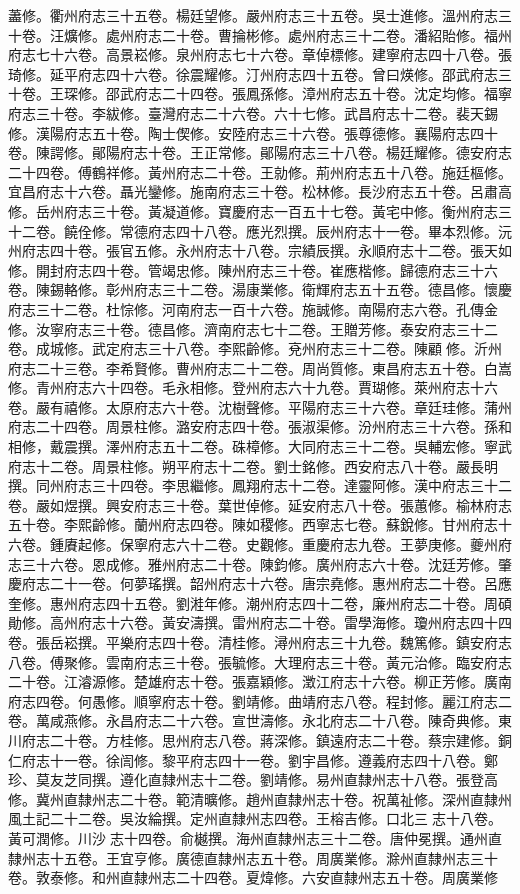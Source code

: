 \begin{pinyinscope}
藎修。衢州府志三十五卷。楊廷望修。嚴州府志三十五卷。吳士進修。溫州府志三十卷。汪爌修。處州府志二十卷。曹掄彬修。處州府志三十二卷。潘紹貽修。福州府志七十六卷。高景崧修。泉州府志七十六卷。章倬標修。建寧府志四十八卷。張琦修。延平府志四十六卷。徐震耀修。汀州府志四十五卷。曾曰煐修。邵武府志三十卷。王琛修。邵武府志二十四卷。張鳳孫修。漳州府志五十卷。沈定均修。福寧府志三十卷。李紱修。臺灣府志二十六卷。六十七修。武昌府志十二卷。裴天錫修。漢陽府志五十卷。陶士偰修。安陸府志三十六卷。張尊德修。襄陽府志四十卷。陳諤修。鄖陽府志十卷。王正常修。鄖陽府志三十八卷。楊廷耀修。德安府志二十四卷。傅鶴祥修。黃州府志二十卷。王勍修。荊州府志五十八卷。施廷樞修。宜昌府志十六卷。聶光鑾修。施南府志三十卷。松林修。長沙府志五十卷。呂肅高修。岳州府志三十卷。黃凝道修。寶慶府志一百五十七卷。黃宅中修。衡州府志三十二卷。饒佺修。常德府志四十八卷。應光烈撰。辰州府志十一卷。畢本烈修。沅州府志四十卷。張官五修。永州府志十八卷。宗績辰撰。永順府志十二卷。張天如修。開封府志四十卷。管竭忠修。陳州府志三十卷。崔應楷修。歸德府志三十六卷。陳錫輅修。彰州府志三十二卷。湯康業修。衛輝府志五十五卷。德昌修。懷慶府志三十二卷。杜悰修。河南府志一百十六卷。施誠修。南陽府志六卷。孔傳金修。汝寧府志三十卷。德昌修。濟南府志七十二卷。王贈芳修。泰安府志三十二卷。成城修。武定府志三十八卷。李熙齡修。兗州府志三十二卷。陳顧修。沂州府志二十三卷。李希賢修。曹州府志二十二卷。周尚質修。東昌府志五十卷。白嵩修。青州府志六十四卷。毛永相修。登州府志六十九卷。賈瑚修。萊州府志十六卷。嚴有禧修。太原府志六十卷。沈樹聲修。平陽府志三十六卷。章廷珪修。蒲州府志二十四卷。周景柱修。潞安府志四十卷。張淑渠修。汾州府志三十六卷。孫和相修，戴震撰。澤州府志五十二卷。硃樟修。大同府志三十二卷。吳輔宏修。寧武府志十二卷。周景柱修。朔平府志十二卷。劉士銘修。西安府志八十卷。嚴長明撰。同州府志三十四卷。李思繼修。鳳翔府志十二卷。達靈阿修。漢中府志三十二卷。嚴如煜撰。興安府志三十卷。葉世倬修。延安府志八十卷。張蕙修。榆林府志五十卷。李熙齡修。蘭州府志四卷。陳如稷修。西寧志七卷。蘇銳修。甘州府志十六卷。鍾賡起修。保寧府志六十二卷。史觀修。重慶府志九卷。王夢庚修。夔州府志三十六卷。恩成修。雅州府志二十卷。陳鈞修。廣州府志六十卷。沈廷芳修。肇慶府志二十一卷。何夢瑤撰。韶州府志十六卷。唐宗堯修。惠州府志二十卷。呂應奎修。惠州府志四十五卷。劉溎年修。潮州府志四十二卷，廉州府志二十卷。周碩勛修。高州府志十六卷。黃安濤撰。雷州府志二十卷。雷學海修。瓊州府志四十四卷。張岳崧撰。平樂府志四十卷。清桂修。潯州府志三十九卷。魏篤修。鎮安府志八卷。傅聚修。雲南府志三十卷。張毓修。大理府志三十卷。黃元治修。臨安府志二十卷。江濬源修。楚雄府志十卷。張嘉穎修。澂江府志十六卷。柳正芳修。廣南府志四卷。何愚修。順寧府志十卷。劉靖修。曲靖府志八卷。程封修。麗江府志二卷。萬咸燕修。永昌府志二十六卷。宣世濤修。永北府志二十八卷。陳奇典修。東川府志二十卷。方桂修。思州府志八卷。蔣深修。鎮遠府志二十卷。蔡宗建修。銅仁府志十一卷。徐訚修。黎平府志四十一卷。劉宇昌修。遵義府志四十八卷。鄭珍、莫友芝同撰。遵化直隸州志十二卷。劉靖修。易州直隸州志十八卷。張登高修。冀州直隸州志二十卷。範清曠修。趙州直隸州志十卷。祝萬祉修。深州直隸州風土記二十二卷。吳汝綸撰。定州直隸州志四卷。王榕吉修。口北三志十八卷。黃可潤修。川沙志十四卷。俞樾撰。海州直隸州志三十二卷。唐仲冕撰。通州直隸州志十五卷。王宜亨修。廣德直隸州志五十卷。周廣業修。滁州直隸州志三十卷。敦泰修。和州直隸州志二十四卷。夏煒修。六安直隸州志五十卷。周廣業修
\end{pinyinscope}
